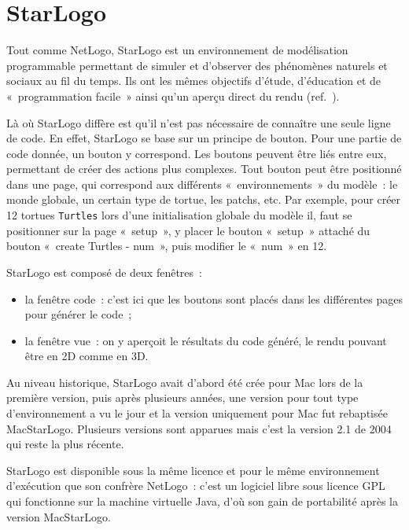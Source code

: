\section{StarLogo}
\label{StarLogo}
Tout comme NetLogo, StarLogo est un environnement de modélisation programmable permettant de simuler et d'observer des phénomènes naturels et sociaux au fil du temps.
Ils ont les mêmes objectifs d'étude, d'éducation et de «~programmation facile~» ainsi qu'un aperçu direct du rendu (ref.~\cite{starlogo}).

Là où StarLogo diffère est qu'il n'est pas nécessaire de connaître une seule ligne de code. En effet, StarLogo se base sur un principe de bouton. Pour une partie de code donnée, un bouton y correspond. Les boutons peuvent être liés entre eux, permettant de créer des actions plus complexes.
Tout bouton peut être positionné dans une page, qui correspond aux différents «~environnements~» du modèle~: le monde globale, un certain type de tortue, les patchs, etc.
Par exemple, pour créer 12 tortues \verb|Turtles| lors d'une initialisation globale du modèle il, faut se positionner sur la page «~setup~», y placer le bouton «~setup~» attaché du bouton «~create Turtles - num~», puis modifier le «~num~» en 12.

StarLogo est composé de deux fenêtres~:
\begin{itemize}
  \item la fenêtre code~: c'est ici que les boutons sont placés dans les différentes pages pour générer le code~;
  \item la fenêtre vue~: on y aperçoit le résultats du code généré, le rendu pouvant être en 2D comme en 3D.
\end{itemize}

Au niveau historique, StarLogo avait d'abord été crée pour Mac lors de la première version, puis après plusieurs années, une version pour tout type d'environnement a vu le jour et la version uniquement pour Mac fut rebaptisée MacStarLogo. Plusieurs versions sont apparues mais c'est la version 2.1 de 2004 qui reste la plus récente.

StarLogo est disponible sous la même licence et pour le même environnement d'exécution que son confrère NetLogo~: c'est un logiciel libre sous licence GPL qui fonctionne sur la machine virtuelle Java, d'où son gain de portabilité après la version MacStarLogo.
